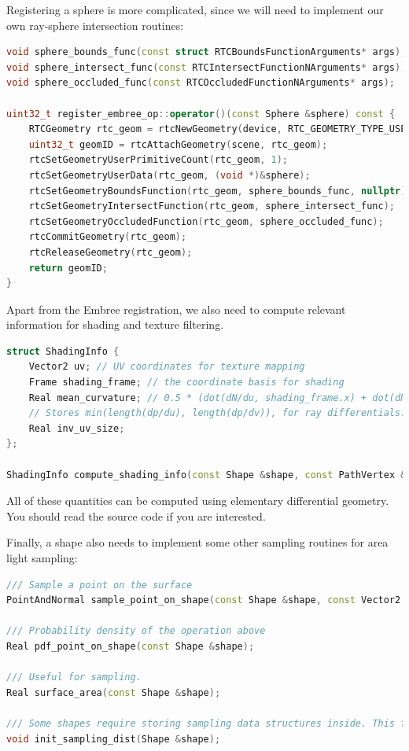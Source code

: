 \documentclass{article}
\begin{document}
Registering a sphere is more complicated, since we will need to implement our own ray-sphere intersection routines:
\begin{lstlisting}[language=c++]
void sphere_bounds_func(const struct RTCBoundsFunctionArguments* args);
void sphere_intersect_func(const RTCIntersectFunctionNArguments* args);
void sphere_occluded_func(const RTCOccludedFunctionNArguments* args);

uint32_t register_embree_op::operator()(const Sphere &sphere) const {
    RTCGeometry rtc_geom = rtcNewGeometry(device, RTC_GEOMETRY_TYPE_USER);
    uint32_t geomID = rtcAttachGeometry(scene, rtc_geom);
    rtcSetGeometryUserPrimitiveCount(rtc_geom, 1);
    rtcSetGeometryUserData(rtc_geom, (void *)&sphere);
    rtcSetGeometryBoundsFunction(rtc_geom, sphere_bounds_func, nullptr);
    rtcSetGeometryIntersectFunction(rtc_geom, sphere_intersect_func);
    rtcSetGeometryOccludedFunction(rtc_geom, sphere_occluded_func);
    rtcCommitGeometry(rtc_geom);
    rtcReleaseGeometry(rtc_geom);
    return geomID;
}
\end{lstlisting}

Apart from the Embree registration, we also need to compute relevant information for shading and texture filtering.
\begin{lstlisting}[language=c++]
struct ShadingInfo {
    Vector2 uv; // UV coordinates for texture mapping
    Frame shading_frame; // the coordinate basis for shading
    Real mean_curvature; // 0.5 * (dot(dN/du, shading_frame.x) + dot(dN/dv, shading_frame.y))
    // Stores min(length(dp/du), length(dp/dv)), for ray differentials.
    Real inv_uv_size;
};

ShadingInfo compute_shading_info(const Shape &shape, const PathVertex &vertex);
\end{lstlisting}
All of these quantities can be computed using elementary differential geometry. You should read the source code if you are interested.

Finally, a shape also needs to implement some other sampling routines for area light sampling:
\begin{lstlisting}[language=c++]
/// Sample a point on the surface
PointAndNormal sample_point_on_shape(const Shape &shape, const Vector2 &uv, Real w);

/// Probability density of the operation above
Real pdf_point_on_shape(const Shape &shape);

/// Useful for sampling.
Real surface_area(const Shape &shape);

/// Some shapes require storing sampling data structures inside. This function initialize them.
void init_sampling_dist(Shape &shape);
\end{lstlisting}
\end{document}
